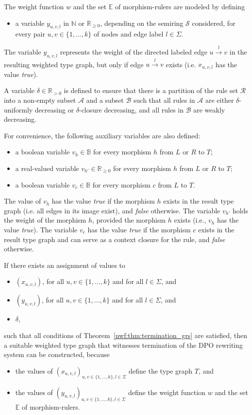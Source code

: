 The weight function $w$ and the set $\mathbb{E}$ of morphism-rulers are modeled by defining 
\begin{itemize}
    \item a variable $y_{u,v,l}$ in $\mathbb{N}$ or $\mathbb{R}_{\geq 0}$, depending on the semiring $\mathcal{S}$ considered,
 for every pair $u,v\in\{1,...,k\}$ of nodes and edge label $l \in \Sigma$. 
\end{itemize} 
The variable $y_{u,v,l}$ represents the weight of the directed labeled edge $u\overset{l}{\to} v$ in the resulting weighted type graph, but only if edge $u\overset{l}{\to} v$ exists (i.e. $x_{u,v,l}$ has the value \textit{true}).

A variable $\delta \in \mathbb{R}_{>0}$ is defined to ensure that there is
a partition of the rule set $\mathcal{R}$ into a non-empty subset $\mathcal{A}$ and a subset $\mathcal{B}$ such that all rules in $\mathcal{A}$ are either $\delta$-uniformly decreasing or $\delta$-closure decreasing, and all rules in $\mathcal{B}$ are weakly decreasing.

For convenience, the following auxiliary variables are also defined:
\begin{itemize}
    \item a boolean variable $v_h \in \mathbb{B}$ for every morphism $h$ from $L$ or $R$ to $T$;
    \item a real-valued variable $v_{h'} \in \mathbb{R}_{\geq 0}$ for every morphism $h$ from $L$ or $R$ to $T$;
    \item a boolean variable $v_c \in \mathbb{B}$ for every morphism $c$ from $L$ to $T$.
\end{itemize}  
The value of $v_h$ has the value \textit{true} if the morphism $h$ exists in the result type graph (i.e. all edges in its image exist), and \textit{false} otherwise.
The variable $v_{h'}$ holds the weight of the morphism $h$, provided the morphism $h$ exists (i.e., $v_h$ has the value \textit{true}).
The variable $v_c$ has the value \textit{true} if the morphism $c$ exists in the result type graph and can serve as a context closure for the rule, and \textit{false} otherwise.

If there exists an assignment of values to 
    \begin{itemize}
        \item $(x_{u,v,l})$, for all $u,v \in \{1,...,k\}$ and for all $l \in \Sigma$, and
        \item $(y_{u,v,l})$, for all $u,v \in \{1,...,k\}$ and for all $l \in \Sigma$, and
        \item $\delta$,
    \end{itemize} 
    such that all conditions of Theorem~\ref{nwf:thm:termination_grs} are satisfied, then a suitable weighted type graph that witnesses termination of the DPO rewriting system can be constructed, because
    \begin{itemize}
        \item the values of \( (x_{u,v,l})_{u,v \in \{1,...,k\}, l \in \Sigma} \) define the type graph $T$, and
        \item the values of \( (y_{u,v,l})_{u,v \in \{1,...,k\}, l \in \Sigma} \) define the weight function $w$ and the set $\mathbb{E}$ of morphism-rulers.
    \end{itemize} 